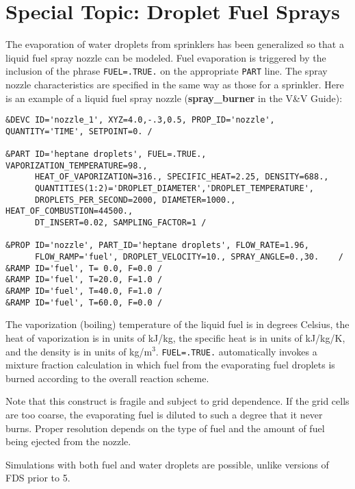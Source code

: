 \documentclass[11pt]{book}
\newcommand{\ct}{\tt\small}
\begin{document}
\section{Special Topic: Droplet Fuel Sprays}

The evaporation of water droplets from sprinklers has been
generalized so that a liquid fuel spray
nozzle can be modeled. Fuel evaporation is triggered by the inclusion of the
phrase {\ct FUEL=.TRUE.} on the appropriate {\ct PART} line.
The spray nozzle characteristics are specified
in the same way as those for a sprinkler. Here is an example of a liquid fuel spray nozzle ({\bf spray\_burner} in the V\&V Guide):

\footnotesize
\begin{verbatim}
&DEVC ID='nozzle_1', XYZ=4.0,-.3,0.5, PROP_ID='nozzle', QUANTITY='TIME', SETPOINT=0. /

&PART ID='heptane droplets', FUEL=.TRUE., VAPORIZATION_TEMPERATURE=98.,
      HEAT_OF_VAPORIZATION=316., SPECIFIC_HEAT=2.25, DENSITY=688.,
      QUANTITIES(1:2)='DROPLET_DIAMETER','DROPLET_TEMPERATURE',
      DROPLETS_PER_SECOND=2000, DIAMETER=1000., HEAT_OF_COMBUSTION=44500.,
      DT_INSERT=0.02, SAMPLING_FACTOR=1 /

&PROP ID='nozzle', PART_ID='heptane droplets', FLOW_RATE=1.96,
      FLOW_RAMP='fuel', DROPLET_VELOCITY=10., SPRAY_ANGLE=0.,30.    /
&RAMP ID='fuel', T= 0.0, F=0.0 /
&RAMP ID='fuel', T=20.0, F=1.0 /
&RAMP ID='fuel', T=40.0, F=1.0 /
&RAMP ID='fuel', T=60.0, F=0.0 /
\end{verbatim}
\normalsize

\noindent
The vaporization (boiling) temperature of
the liquid fuel is in degrees Celsius, the heat of vaporization
is in units of kJ/kg, the specific heat is in units of
kJ/kg/K, and the density is in units of kg/m$^3$.
{\ct FUEL=.TRUE.} automatically
invokes a mixture fraction calculation in which fuel
from the evaporating fuel droplets is burned according to the overall reaction scheme.

Note
that this construct is fragile and subject to grid
dependence. If the grid cells are too coarse, the
evaporating fuel is diluted to such a degree that it
never burns. Proper resolution depends on the type of
fuel and the amount of fuel being ejected from the
nozzle.

\begin{warning}
Simulations with both fuel and water droplets are possible, unlike versions of FDS prior to 5.
\end{warning}
\end{document}
